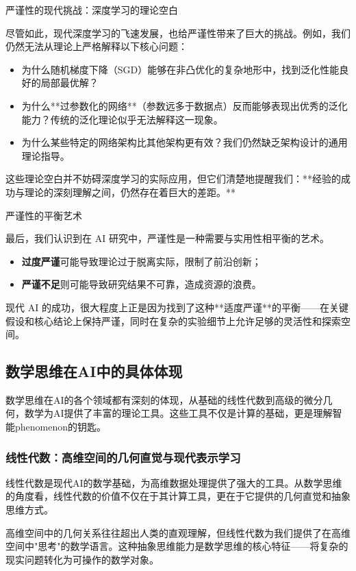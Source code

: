 严谨性的现代挑战：深度学习的理论空白

尽管如此，现代深度学习的飞速发展，也给严谨性带来了巨大的挑战。例如，我们仍然无法从理论上严格解释以下核心问题：

\begin{itemize}
\item 为什么随机梯度下降（SGD）能够在非凸优化的复杂地形中，找到泛化性能良好的局部最优解？
\item 为什么**过参数化的网络**（参数远多于数据点）反而能够表现出优秀的泛化能力？传统的泛化理论似乎无法解释这一现象。
\item 为什么某些特定的网络架构比其他架构更有效？我们仍然缺乏架构设计的通用理论指导。
\end{itemize}

这些理论空白并不妨碍深度学习的实际应用，但它们清楚地提醒我们：**经验的成功与理论的深刻理解之间，仍然存在着巨大的差距。**

严谨性的平衡艺术

最后，我们认识到在 AI 研究中，严谨性是一种需要与实用性相平衡的艺术。
\begin{itemize}
\item \textbf{过度严谨}可能导致理论过于脱离实际，限制了前沿创新；
\item \textbf{严谨不足}则可能导致研究结果不可靠，造成资源的浪费。
\end{itemize}
现代 AI 的成功，很大程度上正是因为找到了这种**适度严谨**的平衡——在关键假设和核心结论上保持严谨，同时在复杂的实验细节上允许足够的灵活性和探索空间。


\subsection{数学思维在AI中的具体体现}

数学思维在AI的各个领域都有深刻的体现，从基础的线性代数到高级的微分几何，数学为AI提供了丰富的理论工具。这些工具不仅是计算的基础，更是理解智能phenomenon的钥匙。

\subsubsection{线性代数：高维空间的几何直觉与现代表示学习}

线性代数是现代AI的数学基础，为高维数据处理提供了强大的工具。从数学思维的角度看，线性代数的价值不仅在于其计算工具，更在于它提供的几何直觉和抽象思维方式。

高维空间中的几何关系往往超出人类的直观理解，但线性代数为我们提供了在高维空间中"思考"的数学语言。这种抽象思维能力是数学思维的核心特征——将复杂的现实问题转化为可操作的数学对象。

